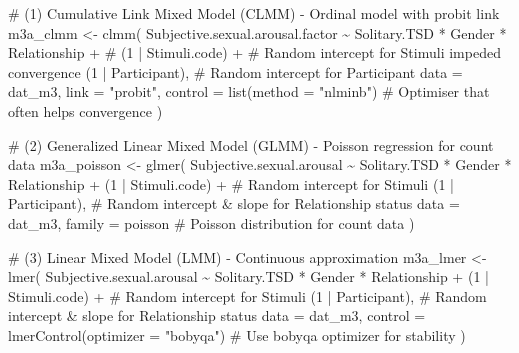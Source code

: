 \documentclass[
  bookmarksnumbered]{article}
\newenvironment{Shaded}{\begin{snugshade}}{\end{snugshade}}
\newcommand{\AttributeTok}[1]{\textcolor[rgb]{0.80,0.80,0.80}{#1}}
\newcommand{\CommentTok}[1]{\textcolor[rgb]{0.50,0.62,0.50}{#1}}
\newcommand{\DecValTok}[1]{\textcolor[rgb]{0.86,0.86,0.80}{#1}}
\newcommand{\FunctionTok}[1]{\textcolor[rgb]{0.94,0.94,0.56}{#1}}
\newcommand{\NormalTok}[1]{\textcolor[rgb]{0.80,0.80,0.80}{#1}}
\newcommand{\OtherTok}[1]{\textcolor[rgb]{0.94,0.94,0.56}{#1}}
\newcommand{\SpecialCharTok}[1]{\textcolor[rgb]{0.86,0.64,0.64}{#1}}
\newcommand{\StringTok}[1]{\textcolor[rgb]{0.80,0.58,0.58}{#1}}
\begin{document}
\begin{Shaded}
\begin{Highlighting}[]
\CommentTok{\# (1) Cumulative Link Mixed Model (CLMM) {-} Ordinal model with probit link}
\NormalTok{m3a\_clmm }\OtherTok{\textless{}{-}} \FunctionTok{clmm}\NormalTok{(}
\NormalTok{  Subjective.sexual.arousal.factor }\SpecialCharTok{\textasciitilde{}}\NormalTok{ Solitary.TSD }\SpecialCharTok{*}\NormalTok{ Gender }\SpecialCharTok{*}\NormalTok{ Relationship }\SpecialCharTok{+}
    \CommentTok{\# (1 | Stimuli.code) + \# Random intercept for Stimuli impeded convergence}
\NormalTok{    (}\DecValTok{1} \SpecialCharTok{|}\NormalTok{ Participant), }\CommentTok{\# Random intercept for Participant}
  \AttributeTok{data =}\NormalTok{ dat\_m3,}
  \AttributeTok{link =} \StringTok{"probit"}\NormalTok{,}
  \AttributeTok{control =} \FunctionTok{list}\NormalTok{(}\AttributeTok{method =} \StringTok{"nlminb"}\NormalTok{) }\CommentTok{\# Optimiser that often helps convergence}
\NormalTok{)}

\CommentTok{\# (2) Generalized Linear Mixed Model (GLMM) {-} Poisson regression for count data}
\NormalTok{m3a\_poisson }\OtherTok{\textless{}{-}} \FunctionTok{glmer}\NormalTok{(}
\NormalTok{  Subjective.sexual.arousal }\SpecialCharTok{\textasciitilde{}}\NormalTok{ Solitary.TSD }\SpecialCharTok{*}\NormalTok{ Gender }\SpecialCharTok{*}\NormalTok{ Relationship }\SpecialCharTok{+}
\NormalTok{    (}\DecValTok{1} \SpecialCharTok{|}\NormalTok{ Stimuli.code) }\SpecialCharTok{+} \CommentTok{\# Random intercept for Stimuli}
\NormalTok{    (}\DecValTok{1} \SpecialCharTok{|}\NormalTok{ Participant), }\CommentTok{\# Random intercept \& slope for Relationship status}
  \AttributeTok{data =}\NormalTok{ dat\_m3,}
  \AttributeTok{family =}\NormalTok{ poisson }\CommentTok{\# Poisson distribution for count data}
\NormalTok{)}

\CommentTok{\# (3) Linear Mixed Model (LMM) {-} Continuous approximation}
\NormalTok{m3a\_lmer }\OtherTok{\textless{}{-}} \FunctionTok{lmer}\NormalTok{(}
\NormalTok{  Subjective.sexual.arousal }\SpecialCharTok{\textasciitilde{}}\NormalTok{ Solitary.TSD }\SpecialCharTok{*}\NormalTok{ Gender }\SpecialCharTok{*}\NormalTok{ Relationship }\SpecialCharTok{+}
\NormalTok{    (}\DecValTok{1} \SpecialCharTok{|}\NormalTok{ Stimuli.code) }\SpecialCharTok{+} \CommentTok{\# Random intercept for Stimuli}
\NormalTok{    (}\DecValTok{1} \SpecialCharTok{|}\NormalTok{ Participant), }\CommentTok{\# Random intercept \& slope for Relationship status}
  \AttributeTok{data =}\NormalTok{ dat\_m3,}
  \AttributeTok{control =} \FunctionTok{lmerControl}\NormalTok{(}\AttributeTok{optimizer =} \StringTok{"bobyqa"}\NormalTok{) }\CommentTok{\# Use \textquotesingle{}bobyqa\textquotesingle{} optimizer for stability}
\NormalTok{)}
\end{Highlighting}
\end{Shaded}
\end{document}
